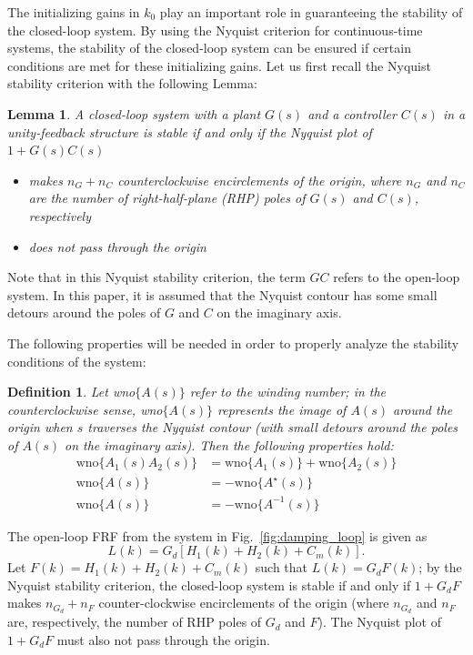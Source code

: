 \documentclass[a4paper, 10pt, conference]{ieeeconf}
\newtheorem{lemma}{Lemma}
\newtheorem{definition}{Definition}
\begin{document}
The initializing gains in $k_0$ play an important role in guaranteeing the stability of the closed-loop system. By using the Nyquist criterion for continuous-time systems, the stability of the closed-loop system can be ensured if certain conditions are met for these initializing gains. Let us first recall the Nyquist stability criterion with the following Lemma:
\begin{lemma}
A closed-loop system with a plant $G(s)$ and a controller $C(s)$ in a unity-feedback structure is stable if and only if the Nyquist plot of $1+G(s)C(s)$
\begin{itemize}
\item makes $n_G + n_C$ counterclockwise encirclements of the origin, where $n_G$ and $n_C$ are the number of right-half-plane (RHP) poles of $G(s)$ and $C(s)$, respectively
\item does not pass through the origin
\end{itemize}
\end{lemma}
Note that in this Nyquist stability criterion, the term $GC$ refers to the open-loop system. In this paper, it is assumed that the Nyquist contour has some small detours around the poles of $G$ and $C$ on the imaginary axis.

The following properties will be needed in order to properly analyze the stability conditions of the system:
\begin{definition}
Let wno$\{ A(s)\}$ refer to the winding number; in the counterclockwise sense, wno$\{ A(s)\}$ represents the image of $A(s)$ around the origin when $s$ traverses the Nyquist contour (with small detours around the poles of $A(s)$ on the imaginary axis). Then the following properties hold:
\begin{align}
\text{wno}\bigl\{ A_1(s)A_2(s) \bigr\} &= \text{wno}\bigl\{ A_1(s) \bigr\} + \text{wno}\bigl\{ A_2(s) \bigr\}  \label{eq:wno_add}\\ 
\text{wno}\bigl\{ A(s)\bigr\} &= -\text{wno}\bigl\{ A^{\star}(s)\bigr\} \label{eq:wno_conj} \\ 
\text{wno}\bigl\{ A(s)\bigr\} &= -\text{wno}\bigl\{ A^{-1}(s)\bigr\} \label{eq:wno_inv}
\end{align}
\end{definition}

The open-loop FRF from the system in Fig.~\ref{fig:damping_loop} is given as $$L(k) = G_d[H_1(k)+H_2(k)+C_m(k)].$$ Let $F(k) = H_1(k)+H_2(k)+C_m(k)$ such that $L(k) = G_dF(k)$; by the Nyquist stability criterion, the closed-loop system is stable if and only if $1+G_dF$ makes $n_{G_d}+n_F$ counter-clockwise encirclements of the origin (where $n_{G_d}$ and $n_F$ are, respectively, the number of RHP poles of $G_d$ and $F$). The Nyquist plot of $1+G_dF$ must also not pass through the origin.
\end{document}
